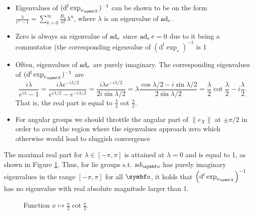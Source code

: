 \begin{itemize}
  \item Eigenvalues of $(\mathrm{d}^l \exp_{e_\X})^{-1}$ can be shown to be on the form $\frac{\lambda}{e^{\lambda} - 1} = \sum_{k=0}^\infty \frac{B_n}{n!} \lambda^n$, where $\lambda$ is an eigenvalue of $\operatorname{ad}_e$.
  \item Zero is always an eigenvalue of $\operatorname{ad}_e$ since $\operatorname{ad}_e e = 0$ due to it being a commutator (the corresponding eigenvalue of $(\mathrm{d}^l \exp_e)^{-1}$ is 1
  \item Often, eigenvalues of $\operatorname{ad}_e$ are purely imaginary. The corresponding eigenvalues of $(\mathrm{d}^l \exp_{e_\X})^{-1}$ are
        \begin{equation}
          \frac{i \lambda}{e^{i \lambda} - 1} = \frac{i \lambda e^{-i \lambda / 2}}{e^{i \lambda / 2} - e^{- i \lambda / 2}} = \frac{i \lambda e^{-i \lambda / 2}}{2 i \sin \lambda / 2} = \lambda \frac{\cos \lambda / 2 - i \sin \lambda / 2}{2 \sin \lambda / 2} = \frac{\lambda}{2} \cot \frac{\lambda}{2} - i \frac{\lambda}{2}.
        \end{equation}
        That is, the real part is equal to $\frac{\lambda}{2}\cot \frac{\lambda}{2}$.
  \item For angular groups we should throttle the angular part of $\| e_X \|$ at $\pm \pi/2$ in order to avoid the region where the eigenvalues approach zero which otherwise would lead to sluggish convergence
\end{itemize}

The maximal real part for $\lambda \in [-\pi, \pi]$ is attained at $\lambda = 0$ and is equal to 1, as shown in Figure \ref{fig:cot_fcn}. Thus, for lie groups s.t. $\ad_\a$ has purely imaginary eigenvalues in the range $[-\pi, \pi]$ for all $\a$, it holds that $\left( \mathrm{d}^l \exp_{e_\X} \right)^{-1}$ has no eigenvalue with real absolute magnitude larger than 1.

\begin{figure}
  \begin{center}
  \end{center}
  \caption{Function $x \mapsto \frac{x}{2} \cot \frac{x}{2}$.}
  \label{fig:cot_fcn}
\end{figure}

